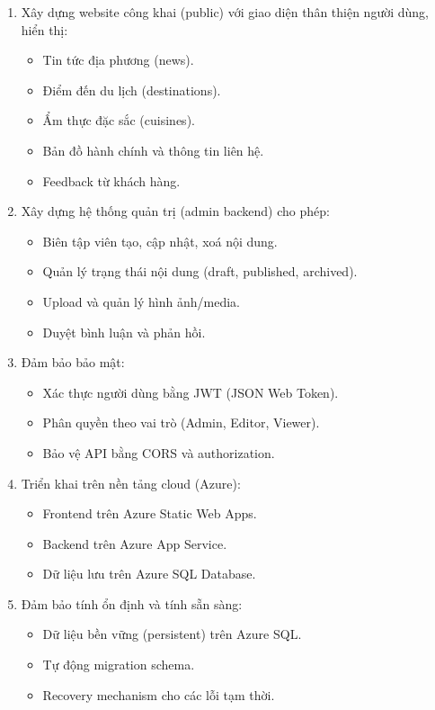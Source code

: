 \documentclass[12pt,a4paper,oneside]{report}
\begin{document}
\begin{enumerate}[itemsep=4pt]
  \item Xây dựng website công khai (public) với giao diện thân thiện người dùng, hiển thị:
  \begin{itemize}
    \item Tin tức địa phương (news).
    \item Điểm đến du lịch (destinations).
    \item Ẩm thực đặc sắc (cuisines).
    \item Bản đồ hành chính và thông tin liên hệ.
    \item Feedback từ khách hàng.
  \end{itemize}
  
  \item Xây dựng hệ thống quản trị (admin backend) cho phép:
  \begin{itemize}
    \item Biên tập viên tạo, cập nhật, xoá nội dung.
    \item Quản lý trạng thái nội dung (draft, published, archived).
    \item Upload và quản lý hình ảnh/media.
    \item Duyệt bình luận và phản hồi.
  \end{itemize}
  
  \item Đảm bảo bảo mật:
  \begin{itemize}
    \item Xác thực người dùng bằng JWT (JSON Web Token).
    \item Phân quyền theo vai trò (Admin, Editor, Viewer).
    \item Bảo vệ API bằng CORS và authorization.
  \end{itemize}
  
  \item Triển khai trên nền tảng cloud (Azure):
  \begin{itemize}
    \item Frontend trên Azure Static Web Apps.
    \item Backend trên Azure App Service.
    \item Dữ liệu lưu trên Azure SQL Database.
  \end{itemize}
  
  \item Đảm bảo tính ổn định và tính sẵn sàng:
  \begin{itemize}
    \item Dữ liệu bền vững (persistent) trên Azure SQL.
    \item Tự động migration schema.
    \item Recovery mechanism cho các lỗi tạm thời.
  \end{itemize}
\end{enumerate}
\end{document}
